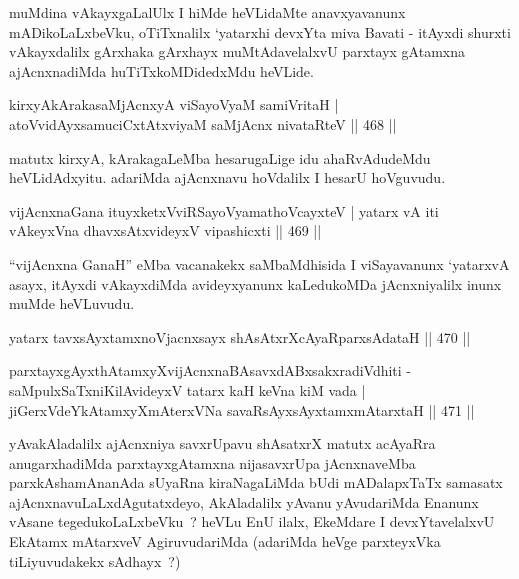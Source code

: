 \begin{artha}
muMdina vAkayxgaLalUlx I hiMde heVLidaMte anavxyavanunx
mADikoLaLxbeVku, oTiTxnalilx `yatarxhi devxYta miva Bavati - itAyxdi
shurxti vAkayxdalilx gArxhaka gArxhayx muMtAdavelalxvU parxtayx
gAtamxna ajAcnxnadiMda huTiTxkoMDidedxMdu heVLide.
\end{artha}

\begin{shl}
kirxyAkArakasaMjAcnxyA viSayoV\s yaM samiVritaH |
atoV\s vidAyxsamuciCxtAtxviyaM saMjAcnx nivataRteV \hfill || 468 ||
\end{shl}

\begin{artha}
matutx kirxyA, kArakagaLeMba hesarugaLige idu ahaRvAdudeMdu
heVLidAdxyitu. adariMda ajAcnxnavu hoVdalilx I hesarU hoVguvudu.
\end{artha}


\begin{shl}
vijAcnxnaGana ituyxketxVviRSayoV\s yamathoVcayxteV |
yatarx vA iti vAkeyxVna dhavxsAtxvideyxV vipashicxti \hfill || 469 ||
\end{shl}

\begin{artha}
``vijAcnxna GanaH'' eMba vacanakekx saMbaMdhisida I viSayavanunx
 `yatarxvA asayx, itAyxdi vAkayxdiMda avideyxyanunx kaLedukoMDa
 jAcnxniyalilx inunx muMde heVLuvudu. 
\end{artha}


\begin{shl}
yatarx tavxsAyx\s \s tamxnoV\s jacnxsayx shAsAtxrXcAyaRparxsAdataH \hfill || 470 ||
\end{shl}
\begin{shl}
parxtayxgAyxthAtamxyXvijAcnxnaBAsavxdABxsakxradiVdhiti -
saMpulxSaTxniKilAvideyxV tatarx kaH keVna kiM vada |
jiGerxVdeYkAtamxyXmAterxVNa savaRsAyxsAyx\s \s tamxmAtarxtaH \hfill || 471 ||
\end{shl}

\begin{artha}
yAvakAladalilx ajAcnxniya savxrUpavu shAsatxrX matutx acAyaRra
anugarxhadiMda parxtayxgAtamxna nijasavxrUpa jAcnxnaveMba
parxkAshamAnanAda sUyaRna kiraNagaLiMda bUdi mADalapxTaTx samasatx
ajAcnxnavuLaLxdAgutatxdeyo, AkAladalilx yAvanu yAvudariMda Enanunx
vAsane tegedukoLaLxbeVku~? heVLu EnU ilalx, EkeMdare I devxYtavelalxvU
EkAtamx mAtarxveV AgiruvudariMda (adariMda heVge parxteyxVka
tiLiyuvudakekx sAdhayx~?)
\end{artha}

